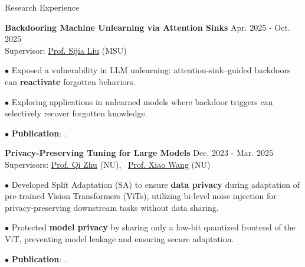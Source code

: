 
\begin{rSection}{Research Experience}
    
     \small{{\bf Backdooring Machine Unlearning via Attention Sinks}  \hfill Apr. 2025 - Oct. 2025
    \\ Supervisor: \href{https://lsjxjtu.github.io/index.html}{\textcolor{BS_color}{Prof. Sijia Liu}} (MSU)
\vspace{-1.5mm}
    
    \quad $\bullet$ Exposed a vulnerability in LLM unlearning: attention-sink–guided backdoors can \textbf{reactivate} forgotten behaviors.
\vspace{-2mm}
    
    \quad $\bullet$ Exploring applications in unlearned models where backdoor triggers can selectively recover forgotten knowledge.

    \quad $\bullet$ \textbf{Publication}: .
    

    }
    
    \small{{\bf Privacy-Preserving Tuning for Large Models}  \hfill Dec. 2023 - Mar. 2025
    \\  Supervisors: \href{https://scholar.google.com/citations?user=TN09YMcAAAAJ&hl=en}{\textcolor{BS_color}{Prof. Qi Zhu}} (NU), \ \href{https://wangxiao1254.github.io/}{\textcolor{BS_color}{Prof. Xiao Wang}} (NU)
\vspace{-1.5mm}
    
    
    \quad $\bullet$ Developed Split Adaptation (SA) to ensure \textbf{data privacy }during adaptation of pre-trained Vision Transformers
(ViTs), utilizing bi-level noise injection for privacy-preserving downstream tasks without data sharing.
\vspace{-2mm}

    \quad $\bullet$ Protected \textbf{model privacy} by sharing only a low-bit quantized frontend of the ViT, preventing model leakage and
ensuring secure adaptation.
\vspace{-2mm}

    \quad $\bullet$ \textbf{Publication}: .


}
    \end{rSection}